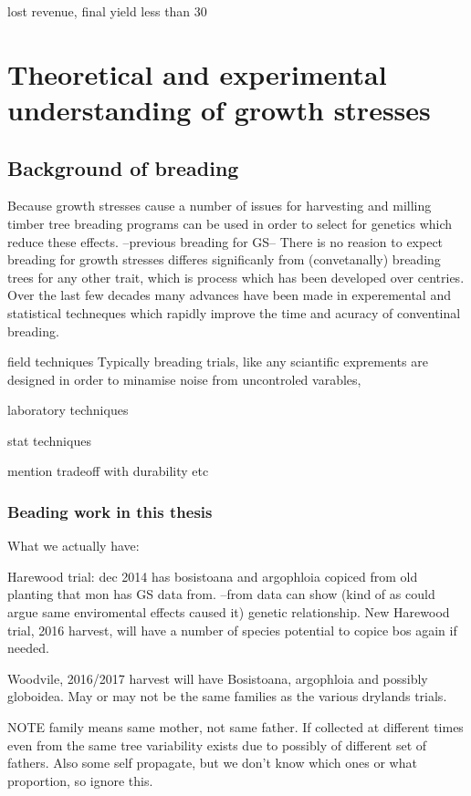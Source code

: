 \documentclass{article}
\begin{document}
lost revenue, final yield less than 30%


\section{Theoretical and experimental understanding of growth stresses}

\subsection{Background of breading}
Because growth stresses cause a number of issues for harvesting and milling
timber tree breading programs can be used in order to select for genetics which
reduce these effects. --previous breading for GS-- There is no reasion to
expect  breading for growth stresses differes significanly from (convetanally)
breading trees for any other trait, which is process which has been developed
over centries. Over the last few decades many advances have been made in
experemental and statistical techneques which rapidly improve the time and
acuracy of conventinal breading.

 field techniques
Typically breading trials, like any sciantific exprements are designed in order
to minamise noise from uncontroled varables,

laboratory techniques


stat techniques

mention tradeoff with durability etc

\subsubsection{Beading work in this thesis}
What we actually have:

Harewood trial:
dec 2014 has bosistoana and argophloia copiced from old planting that mon has GS
data from. --from data can show (kind of as could argue same enviromental
effects caused it) genetic relationship.
New Harewood trial, 2016 harvest, will
have a number of species potential to copice bos again if needed.

Woodvile, 2016/2017 harvest will have Bosistoana, argophloia and possibly globoidea.
May or may not be the same families as the various drylands trials.

NOTE family means same mother, not same father.
If collected at different times even from the same tree variability exists due
to possibly of different set of fathers. Also some self propagate, but we don't
know which ones or what proportion, so ignore this.
\end{document}
